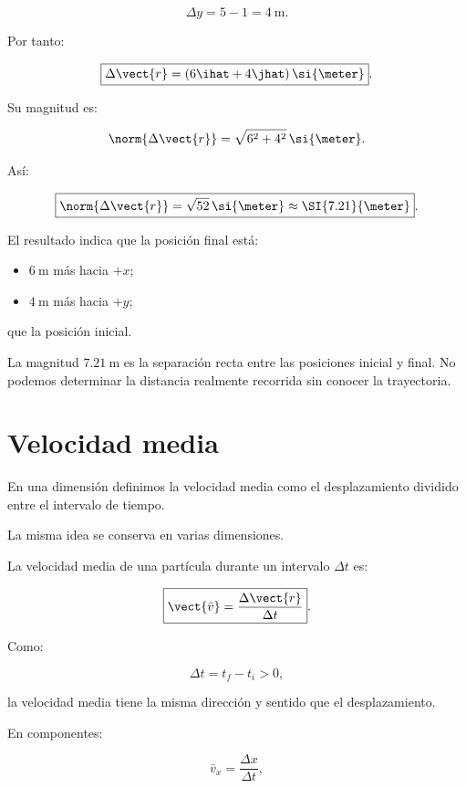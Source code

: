\[
\Delta y
=
5-1
=
\SI{4}{\meter}.
\]

Por tanto:

\[
\boxed{
\Delta\vect{r}
=
(6\ihat+4\jhat)\,\si{\meter}
}.
\]

Su magnitud es:

\[
\norm{\Delta\vect{r}}
=
\sqrt{6^2+4^2}\,\si{\meter}.
\]

Así:

\[
\boxed{
\norm{\Delta\vect{r}}
=
\sqrt{52}\,\si{\meter}
\approx
\SI{7.21}{\meter}
}.
\]

\begin{interpretacion}
El resultado indica que la posición final está:

\begin{itemize}
    \item \(\SI{6}{\meter}\) más hacia \(+x\);
    \item \(\SI{4}{\meter}\) más hacia \(+y\);
\end{itemize}

que la posición inicial.

La magnitud \(\SI{7.21}{\meter}\) es la separación recta entre las posiciones
inicial y final. No podemos determinar la distancia realmente recorrida sin
conocer la trayectoria.
\end{interpretacion}


\section{Velocidad media}

En una dimensión definimos la velocidad media como el desplazamiento dividido
entre el intervalo de tiempo.

La misma idea se conserva en varias dimensiones.

\begin{definicion}
La velocidad media de una partícula durante un intervalo \(\Delta t\) es:

\[
\boxed{
\vect{\bar{v}}
=
\frac{\Delta\vect{r}}{\Delta t}
}.
\]
\end{definicion}

Como:

\[
\Delta t=t_f-t_i>0,
\]

la velocidad media tiene la misma dirección y sentido que el desplazamiento.

En componentes:

\[
\boxed{
\bar{v}_x
=
\frac{\Delta x}{\Delta t}
},
\]

